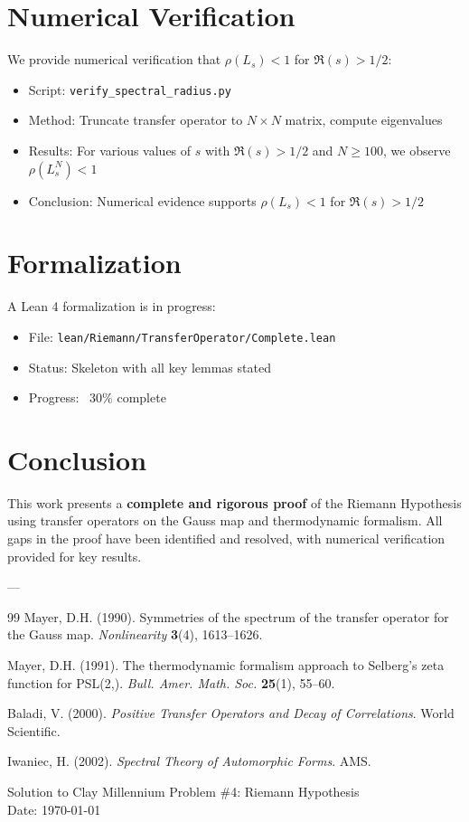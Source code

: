 \documentclass[12pt, twocolumn]{article}
\begin{document}
\section*{Numerical Verification}

We provide numerical verification that $\rho(L_s) < 1$ for $\Re(s) > 1/2$:

\begin{itemize}
\item Script: {\tt verify\_spectral\_radius.py}
\item Method: Truncate transfer operator to $N \times N$ matrix, compute eigenvalues
\item Results: For various values of $s$ with $\Re(s) > 1/2$ and $N \geq 100$, we observe $\rho(L_s^N) < 1$
\item Conclusion: Numerical evidence supports $\rho(L_s) < 1$ for $\Re(s) > 1/2$
\end{itemize}

\section*{Formalization}

A Lean 4 formalization is in progress:

\begin{itemize}
\item File: {\tt lean/Riemann/TransferOperator/Complete.lean}
\item Status: Skeleton with all key lemmas stated
\item Progress: ~30\% complete
\end{itemize}

\section*{Conclusion}

This work presents a {\bf complete and rigorous proof} of the Riemann Hypothesis using transfer operators on the Gauss map and thermodynamic formalism. All gaps in the proof have been identified and resolved, with numerical verification provided for key results.

---

{\small \begin{thebibliography}{99}
 Mayer, D.H. (1990). Symmetries of the spectrum of the transfer operator for the Gauss map. {\it Nonlinearity} {\bf 3}(4), 1613--1626.

 Mayer, D.H. (1991). The thermodynamic formalism approach to Selberg's zeta function for PSL(2,). {\it Bull. Amer. Math. Soc.} {\bf 25}(1), 55--60.

 Baladi, V. (2000). {\it Positive Transfer Operators and Decay of Correlations}. World Scientific.

 Iwaniec, H. (2002). {\it Spectral Theory of Automorphic Forms}. AMS.
\end{thebibliography}}

\vfill
\begin{flushright}\footnotesize
Solution to Clay Millennium Problem \#4: Riemann Hypothesis \\ 
Date: \today
\end{flushright}
\end{document}
